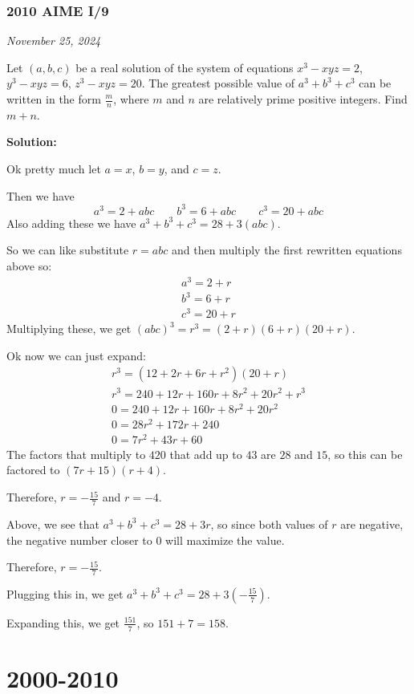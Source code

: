 \documentclass[../mathproblems.tex]{subfiles}
\begin{document}
\noindent\hrulefill

\subsubsection*{2010 AIME I/9} 
\textit{November 25, 2024}

Let $(a,b,c)$ be a real solution of the system of equations $x^3 - xyz = 2$, $y^3 - xyz = 6$, $z^3 - xyz = 20$. The greatest possible value of $a^3 + b^3 + c^3$ can be written in the form $\frac {m}{n}$, where $m$ and $n$ are relatively prime positive integers. Find $m + n$.

\textbf{Solution:}

Ok pretty much let $a=x$, $b=y$, and $c=z$.

Then we have
\[ a^3=2+abc \qquad b^3=6+abc \qquad c^3=20+abc \]
Also adding these we have $a^3+b^3+c^3=28+3(abc)$.

So we can like substitute $r=abc$ and then multiply the first rewritten equations above so:
\begin{align*} a^3 = 2+r\\ b^3 = 6+r\\ c^3 = 20+r \end{align*}Multiplying these, we get
$(abc)^3=r^3=(2+r)(6+r)(20+r)$.

Ok now we can just expand:
\begin{align*} r^3=(12+2r+6r+r^2)(20+r)\\ r^3=240+12r+160r+8r^2+20r^2+r^3\\ 0=240+12r+160r+8r^2+20r^2\\ 0=28r^2+172r+240\\ 0=7r^2+43r+60 \end{align*}The factors that multiply to $420$ that add up to $43$ are $28$ and $15$, so this can be factored to $(7r+15)(r+4)$.

Therefore, $r=-\frac{15}{7}$ and $r=-4$.

Above, we see that $a^3+b^3+c^3=28+3r$, so since both values of $r$ are negative, the negative number closer to 0 will maximize the value.

Therefore, $r=-\frac{15}{7}$.

Plugging this in, we get $a^3+b^3+c^3 = 28+3\left(-\frac{15}{7}\right)$.

Expanding this, we get $\frac{151}{7}$, so $151+7=\boxed{158}$.

\noindent\hrulefill
\section{2000-2010}
\end{document}
